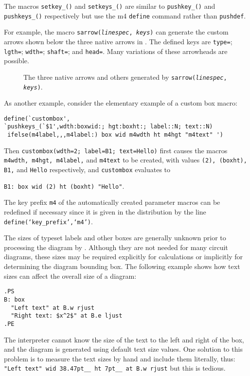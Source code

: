 The macros {\tt setkey\_()} and {\tt setkeys\_()} are similar to
{\tt pushkey\_()} and {\tt pushkeys\_()} respectively but use the
m4 {\tt define} command rather than {\tt pushdef}.

For example, the macro
{\tt sarrow({\sl linespec}, {\sl keys})}
can generate the custom arrows shown below the three native arrows
in .  The defined keys are
 {\tt type=}; {\tt lgth=}; {\tt wdth=}; {\tt shaft=}; and {\tt head=}. 
Many variations of these arrowheads are possible.
\begin{figure}[H]
   
   \caption{The three \dpic native arrows and others generated by
    {\tt sarrow({\sl linespec}, {\sl keys})}.}
   \label{arrowex}
   \end{figure}

As another example, consider the elementary example of a custom box macro:

\begin{verbatim}
define(`custombox',
`pushkeys_(`$1',wdth:boxwid:; hgt:boxht:; label::N; text::N)
 ifelse(m4label,,,m4label:) box wid m4wdth ht m4hgt "m4text" ')
\end{verbatim}

Then {\tt custombox(wdth=2; label=B1; text=Hello)}
first causes the macros {\tt m4wdth, m4hgt, m4label,} and {\tt m4text}
to be created, with values {\tt (2), (boxht), B1,} and {\tt Hello}
respectively, and {\tt custombox} evaluates to

{\tt B1:\ box wid (2) ht (boxht) "Hello"}.

The key prefix {\tt m4} of the automatically created parameter macros can be
redefined if necessary since it is given in the distribution by the line
{\tt define(`key\_prefix',`m4')}.


The sizes of typeset labels and other \tex boxes are generally unknown
prior to processing the diagram by \latex.
Although they are not needed for many circuit diagrams,
these sizes may be required explicitly for calculations or implicitly
for determining the diagram bounding box.  
The following example shows how text sizes can affect the overall size of
a diagram:

\begin{verbatim}
.PS
B: box
  "Left text" at B.w rjust
  "Right text: $x^2$" at B.e ljust
.PE
\end{verbatim}

The \pic interpreter cannot know the size of the text to the left
and right of the box, and the diagram is generated using
default text size values.  One solution to this problem is to measure the
text sizes by hand and include them literally, thus:\hfill\break
\hbox{}\quad%
\verb|"Left text" wid 38.47pt__ ht 7pt__ at B.w rjust|\hfill\break
but this is tedious.

